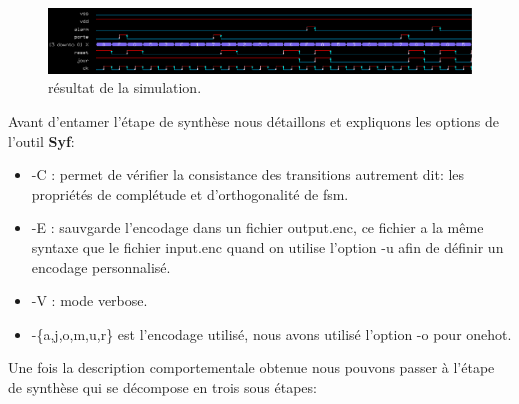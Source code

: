 \documentclass[12pt]{article}
\begin{document}
\begin{figure}
\begin{center}
  \includegraphics[width = 16cm]{pic/asimut.png}
\end{center}
\caption{résultat de la  simulation.}
\end{figure}Avant d'entamer l'étape de synthèse nous détaillons et expliquons les options de l'outil \textbf{Syf}:\\
\begin{itemize}
\item -C : permet de vérifier la consistance des transitions autrement dit: les propriétés de  complétude  et d'orthogonalité de fsm.
\item -E : sauvgarde l'encodage dans un fichier output.enc, ce fichier a la même syntaxe que le fichier input.enc quand on utilise l'option -u afin de définir un encodage personnalisé.
\item -V : mode verbose.
\item -\{a,j,o,m,u,r\} est l'encodage utilisé, nous avons utilisé l'option -o pour onehot.
\end{itemize}
Une fois la description comportementale obtenue nous pouvons passer à l'étape de synthèse qui se décompose en trois sous étapes:
\end{document}
